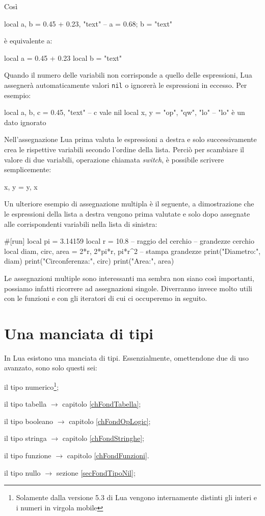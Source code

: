 Così
\begin{lines}
local a, b = 0.45 + 0.23, "text" -- a = 0.68; b = "text"
\end{lines}
è equivalente a:
\begin{lines}
local a = 0.45 + 0.23
local b = "text"
\end{lines}

Quando il numero delle variabili non corrisponde a quello delle espressioni, Lua
assegnerà automaticamente valori \texttt{nil} o ignorerà le espressioni in
eccesso. Per esempio:
\begin{lines}
local a, b, c = 0.45, "text"  -- c vale nil
local x, y = "op", "qw", "lo" -- "lo" è un dato ignorato
\end{lines}

Nell'assegnazione Lua prima valuta le espressioni a destra e solo
successivamente crea le rispettive variabili secondo l'ordine della lista.
Perciò per scambiare il valore di due variabili, operazione chiamata
\emph{switch}, è possibile scrivere semplicemente:
\begin{lines}
x, y = y, x
\end{lines}

Un ulteriore esempio di assegnazione multipla è il seguente, a dimostrazione
che le espressioni della lista a destra vengono prima valutate e solo dopo
assegnate alle corrispondenti variabili nella lista di sinistra:
\begin{lines}
#[run]
local pi = 3.14159
local r = 10.8 -- raggio del cerchio
-- grandezze cerchio
local diam, circ, area = 2*r, 2*pi*r, pi*r^2
-- stampa grandezze
print("Diametro:", diam)
print("Circonferenza:", circ)
print("Area:", area)
\end{lines}

Le assegnazioni multiple sono interessanti ma sembra non siano così importanti,
possiamo infatti ricorrere ad assegnazioni singole. Diverranno invece molto
utili con le funzioni e con gli iteratori di cui ci occuperemo in seguito.


\section{Una manciata di tipi}
\label{secFondManciataTipi}

In Lua esistono una manciata di tipi. Essenzialmente, omettendone due di uso
avanzato, sono solo questi sei:
\begin{compactitemize}
\item {} il tipo numerico\footnote{Solamente dalla versione 5.3 di Lua
vengono internamente distinti gli interi e i numeri in virgola mobile};
\item {} il tipo tabella \( \to \) capitolo \ref{chFondTabella};
\item {} il tipo booleano \( \to \) capitolo \ref{chFondOpLogic};
\item {} il tipo stringa \( \to \) capitolo \ref{chFondStringhe};
\item {} il tipo funzione \( \to \) capitolo \ref{chFondFunzioni}.
\item {} il tipo nullo \( \to \) sezione \ref{secFondTipoNil};
\end{compactitemize}

